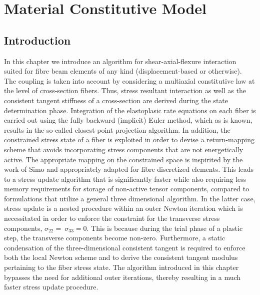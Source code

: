 \chapter{Material Constitutive Model}

\section{Introduction}\label{section:CH3-S1}

In this chapter we introduce an algorithm for shear-axial-flexure interaction 
suited for fibre beam elements of any kind (displacement-based or otherwise). 
The coupling is taken into account by considering a multiaxial constitutive law 
at the level of cross-section fibers. Thus, stress resultant interaction as 
well as the consistent tangent stiffness of a cross-section are derived during 
the state determination phase. Integration of the elastoplasic rate equations 
on each fiber is carried out using the fully backward (implicit) Euler method, 
which as is known, results in the so-called closest point projection algorithm. 
In addition, the constrained stress state of a fiber is exploited in order to 
devise a return-mapping scheme that avoids incorporating stress components that 
are not energetically active. The appropriate mapping on the constrained space 
is inspirited by the work of Simo\cite{Simo1986} and appropriately adapted for 
fibre 
discretized elements. This leads to a stress update algorithm that is 
significantly faster while also requiring less memory requirements for storage 
of non-active tensor components, compared to formulations that utilize a 
general three 
dimensional 
algorithm\cite{Papachristidis2010,Saritas2009,Ceresa2009,Gregori2007,Kagermanov2017}.
 In the latter case, stress update is a nested 
procedure within an outer Newton iteration which is necessitated in order to 
enforce the constraint for the transverse stress components, $\sigma_{22}=\ 
\sigma_{33}=0$. This is because during the trial phase of a plastic step, the 
transverse components become non-zero. Furthermore, a static condensation of 
the three-dimensional consistent tangent is required to enforce both the local 
Newton scheme and to derive the consistent tangent modulus pertaining to the 
fiber stress state. The algorithm introduced in this chapter bypasses the need 
for additional outer iterations, thereby resulting in a much faster stress 
update procedure.

